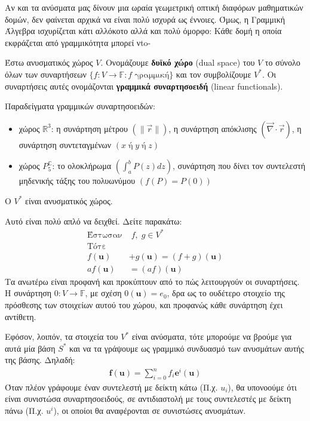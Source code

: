 \documentclass[main.tex]{subfiles}
\begin{document}
	Αν και τα ανύσματα μας δίνουν μια ωραία γεωμετρική οπτική διαφόρων μαθηματικών δομών, δεν φαίνεται αρχικά να είναι πολύ ισχυρά ως έννοιες. Όμως, η Γραμμική Άλγεβρα ισχυρίζεται κάτι αλλόκοτο αλλά και πολύ όμορφο: Κάθε δομή η οποία εκφράζεται από γραμμικότητα μπορεί νto-
	\begin{definition}
		Έστω ανυσματικός χώρος $V$. Ονομάζουμε \textbf{δυϊκό χώρο} (dual space) του $V$ το σύνολο όλων των συναρτήσεων ${\{f:V\rightarrow\mathbb{F} : f \;\text{γραμμική}\}}$ και τον συμβολίζουμε $V^*$. Οι συναρτήσεις αυτές ονομάζονται \textbf{γραμμικά συναρτησοειδή} (linear functionals).
	\end{definition}

	Παραδείγματα γραμμικών συναρτησοειδών:
	\begin{itemize}
		\item χώρος $\mathbb{R}^3$: η συνάρτηση μέτρου $(\|\vec{r}\|)$, η συνάρτηση απόκλισης $(\vec\nabla\cdot\vec{r})$, η συνάρτηση συντεταγμένων $(x\;\text{ή}\;y\;\text{ή}\;z)$
		\item χώρος $P_5^{\mathbb{C}}$: το ολοκλήρωμα $(\int_{a}^{b}P(z)dz)$, συνάρτηση που δίνει τον συντελεστή μηδενικής τάξης του πολυωνύμου $(f(P) = P(0))$
	\end{itemize}

	\begin{corollary}
		Ο $V^*$ είναι ανυσματικός χώρος.
	\end{corollary}

	Αυτό είναι πολύ απλό να δειχθεί. Δείτε παρακάτω:
	\begin{align*}
		\text{Έστωσαν}&\;f,\;g\in V^*\\
		\text{Τότε}&\\
		f(\boldsymbol{u}) &+ g(\boldsymbol{u}) = (f + g)(\boldsymbol{u})\\
		af(\boldsymbol{u}) &= (af)(\boldsymbol{u})
	\end{align*}
	Τα ανωτέρω είναι προφανή και προκύπτουν από το πώς λειτουργούν οι συναρτήσεις. Η συνάρτηση $0:V\rightarrow\mathbb{F}$, με σχέση $0(\boldsymbol{u}) = e_0$, δρα ως το ουδέτερο στοιχείο της πρόσθεσης των στοιχείων αυτού του χώρου, και προφανώς κάθε συνάρτηση έχει αντίθετη. 
	
	Εφόσον, λοιπόν, τα στοιχεία του $V^*$ είναι ανύσματα, τότε μπορούμε να βρούμε για αυτά μία βάση $S^*$ και να τα γράψουμε ως γραμμικό συνδυασμό των ανυσμάτων αυτής της βάσης. Δηλαδή:
	\begin{align*}
		\boldsymbol{f}(\boldsymbol{u}) = \sum^{n}_{i=0}f_i\boldsymbol{e}^i(\boldsymbol{u})
	\end{align*}
	Όταν πλέον γράφουμε έναν συντελεστή με δείκτη κάτω (Π.χ. $u_i$), θα υπονοούμε ότι είναι συνιστώσα συναρτησοειδούς, σε αντιδιαστολή με τους συντελεστές με δείκτη πάνω (Π.χ. $u^i$), οι οποίοι θα αναφέρονται σε συνιστώσες ανυσμάτων.
	
\end{document}
